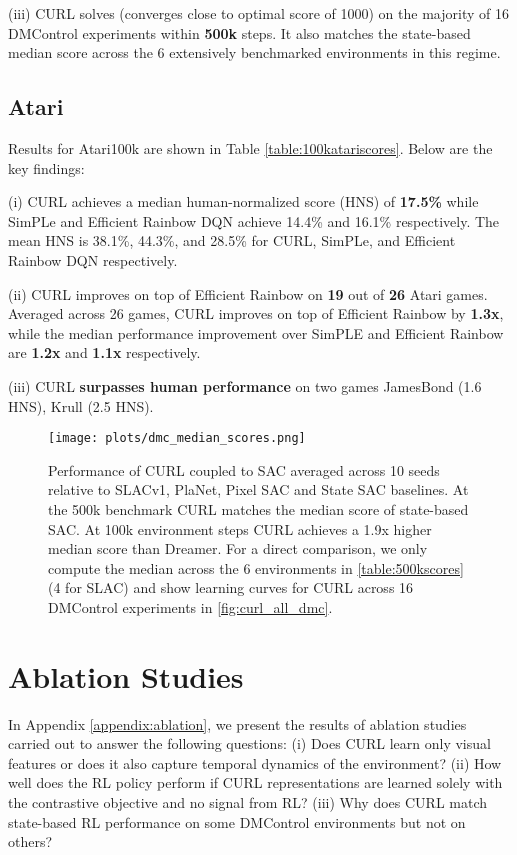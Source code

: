 \documentclass{article}
\begin{document}
(iii) CURL solves (converges close to optimal score of 1000) on the majority of 16 DMControl experiments within {\textbf{500k}} steps. It also matches the state-based median score across the 6 extensively benchmarked environments in this regime.

\subsection{Atari} 
Results for Atari100k are shown in Table \ref{table:100katariscores}. Below are the key findings:

(i) CURL achieves a median human-normalized score (HNS) of {\textbf{17.5\%}} while SimPLe and Efficient Rainbow DQN achieve 14.4\% and 16.1\% respectively. The mean HNS is 38.1\%, 44.3\%, and 28.5\% for CURL, SimPLe, and Efficient Rainbow DQN respectively. 

(ii) CURL improves on top of Efficient Rainbow on {\bf 19} out of {\bf 26} Atari games. Averaged across 26 games, CURL improves on top of Efficient Rainbow by {\bf 1.3x}, while the median performance improvement over SimPLE and Efficient Rainbow are {\bf 1.2x} and {\bf 1.1x} respectively.

(iii) CURL {\textbf{surpasses human performance}} on two games JamesBond (1.6 HNS), Krull (2.5 HNS).
 \begin{figure}[ht]
 \begin{center}
   \centerline{\texttt{[image: plots/dmc\_median\_scores.png]}}
   \caption{Performance of CURL coupled to SAC averaged across 10 seeds relative to SLACv1, PlaNet, Pixel SAC and State SAC baselines. At the 500k benchmark CURL matches the median score of state-based SAC. At 100k environment steps CURL achieves a 1.9x higher median score than Dreamer. For a direct comparison, we only compute the median across the 6 environments in \ref{table:500kscores} (4 for SLAC) and show learning curves for CURL across 16 DMControl experiments in \ref{fig:curl_all_dmc}.} 
   \label{fig:curl_main_result}
 \end{center}
 \vskip -0.3in
 \end{figure}



\section{Ablation Studies}


In Appendix \ref{appendix:ablation}, we present the results of ablation studies carried out to answer the following questions: (i) Does CURL learn only visual features or does it also capture temporal dynamics of the environment? (ii) How well does the RL policy perform if CURL representations are learned solely with the contrastive objective and no signal from RL? (iii) Why does CURL match state-based RL performance on some DMControl environments but not on others?
\end{document}
